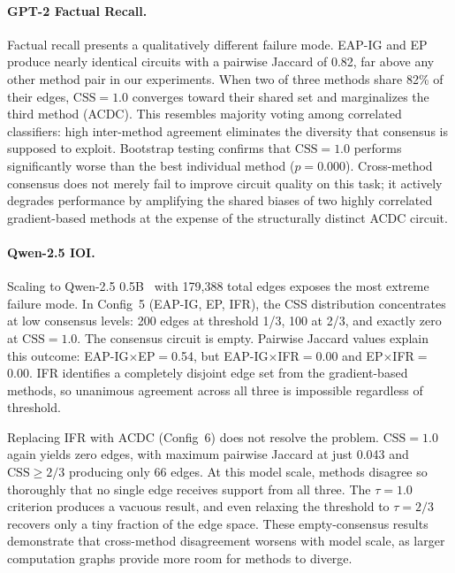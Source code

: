 \paragraph{GPT-2 Factual Recall.}
Factual recall presents a qualitatively different failure mode.
EAP-IG and EP produce nearly identical circuits with a pairwise Jaccard of 0.82, far above any other method pair in our experiments.
When two of three methods share 82\% of their edges, $\text{CSS}=1.0$ converges toward their shared set and marginalizes the third method (ACDC).
This resembles majority voting among correlated classifiers: high inter-method agreement eliminates the diversity that consensus is supposed to exploit.
Bootstrap testing confirms that $\text{CSS}=1.0$ performs significantly worse than the best individual method ($p = 0.000$).
Cross-method consensus does not merely fail to improve circuit quality on this task; it actively degrades performance by amplifying the shared biases of two highly correlated gradient-based methods at the expense of the structurally distinct ACDC circuit.

\paragraph{Qwen-2.5 IOI.}
Scaling to Qwen-2.5 0.5B~\cite{qwen2025qwen} with 179,388 total edges exposes the most extreme failure mode.
In Config~5 (EAP-IG, EP, IFR), the CSS distribution concentrates at low consensus levels: 200 edges at threshold 1/3, 100 at 2/3, and exactly zero at $\text{CSS}=1.0$.
The consensus circuit is empty.
Pairwise Jaccard values explain this outcome: EAP-IG${\times}$EP${=}$0.54, but EAP-IG${\times}$IFR${=}$0.00 and EP${\times}$IFR${=}$0.00.
IFR identifies a completely disjoint edge set from the gradient-based methods, so unanimous agreement across all three is impossible regardless of threshold.

Replacing IFR with ACDC (Config~6) does not resolve the problem.
$\text{CSS}=1.0$ again yields zero edges, with maximum pairwise Jaccard at just 0.043 and $\text{CSS}{\geq}2/3$ producing only 66 edges.
At this model scale, methods disagree so thoroughly that no single edge receives support from all three.
The $\tau{=}1.0$ criterion produces a vacuous result, and even relaxing the threshold to $\tau{=}2/3$ recovers only a tiny fraction of the edge space.
These empty-consensus results demonstrate that cross-method disagreement worsens with model scale, as larger computation graphs provide more room for methods to diverge.


